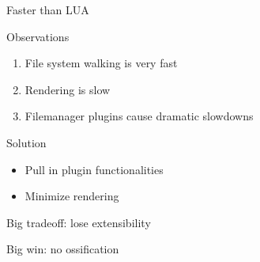 \documentclass{beamer}
\begin{document}
\begin{frame}{Faster than LUA}

	\begin{block}{Observations}

		\begin{enumerate}

			\item File system walking is very fast

			\item Rendering is slow

			\item Filemanager plugins cause dramatic slowdowns

		\end{enumerate}

	\end{block}

	\begin{block}{Solution}

		\begin{itemize}

			\item Pull in plugin functionalities

			\item Minimize rendering

		\end{itemize}

	\end{block}

	Big tradeoff: lose extensibility

	Big win: no ossification

\end{frame}
\end{document}
